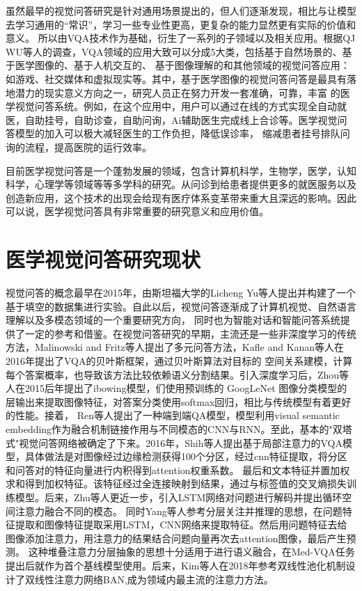 虽然最早的视觉问答研究是针对通用场景提出的，但人们逐渐发现，相比与让模型去学习通用的“常识”，学习一些专业性更高，更复杂的能力显然更有实际的价值和意义。
所以由VQA技术作为基础，衍生了一系列的子领域以及相关应用。根据QJ WU等人\cite{wu2017visual}的调查，VQA领域的应用大致可以分成5大类，包括基于自然场景的、基于医学图像的、基于人机交互的、
基于图像理解的和其他领域的视觉问答应用：如游戏、社交媒体和虚拟现实等。其中，基于医学图像的视觉问答问答是最具有落地潜力的现实意义方向之一，研究人员正在努力开发一套准确，可靠，丰富
的医学视觉问答系统。例如，在这个应用中，用户可以通过在线的方式实现全自动就医，自助挂号，自助诊查，自助问询，Ai辅助医生完成线上合诊等。医学视觉问答模型的加入可以极大减轻医生的工作负担，降低误诊率，
缩减患者挂号排队问询的流程，提高医院的运行效率。

目前医学视觉问答是一个蓬勃发展的领域，包含计算机科学，生物学，医学，认知科学，心理学等领域等等多学科的研究。从问诊到给患者提供更多的就医服务以及
创造新应用，这个技术的出现会给现有医疗体系变革带来重大且深远的影响。因此可以说，医学视觉问答具有非常重要的研究意义和应用价值。

%
\section{医学视觉问答研究现状}
视觉问答的概念最早在2015年，由斯坦福大学的Licheng Yu等人提出\cite{yu2015visual}并构建了一个基于填空的数据集进行实验。自此以后，视觉问答逐渐成了计算机视觉、自然语言理解以及多模态领域的一个重要研究方向，
同时也为智能对话和智能问答系统提供了一定的参考和借鉴。在视觉问答研究的早期，主流还是一些非深度学习的传统方法，Malinowski and Fritz等人提出了多元问答方法\cite{malinowski2014multi}，Kafle and Kanan等人\cite{kafle2016answer}在2016年提出了VQA的贝叶斯框架，通过贝叶斯算法对目标的
空间关系建模，计算每个答案概率，也导致该方法比较依赖语义分割结果。引入深度学习后，Zhou等人\cite{zhou2015simple}在2015后年提出了ibowing模型，们使用预训练的 GoogLeNet 图像分类模型的层输出来提取图像特征，对答案分类使用softmax回归，相比与传统模型有着更好的性能。接着，
Ren等人\cite{ren2015exploring}提出了一种端到端QA模型，模型利用visual semantic embedding作为融合机制链接作用与不同模态的CNN与RNN。至此，基本的"双塔式"视觉问答网络被确定了下来。2016年，Shih等人\cite{shih2016look}提出基于局部注意力的VQA模型，具体做法是对图像经过边缘检测获得100个分区，经过cnn特征提取，将分区和问答对的特征向量进行内积得到attention权重系数。
最后和文本特征并置加权求和得到加权特征。该特征经过全连接映射到结果，通过与标签值的交叉熵损失训练模型。后来，Zhu等人\cite{zhu2016visual7w}更近一步，引入LSTM网络对问题进行解码并提出循环空间注意力融合不同的模态。
同时Yang等人参考分层关注并推理的思想，在问题特征提取和图像特征提取采用LSTM，CNN网络来提取特征。然后用问题特征去给图像添加注意力，用注意力的结果结合问题向量再次去attention图像，最后产生预测。
这种堆叠注意力分层抽象的思想十分适用于进行语义融合，在Med-VQA任务提出后就作为首个基线模型使用\cite{liu2016attention}。后来，Kim等人在2018年参考双线性池化机制设计了双线性注意力网络BAN\cite{kim2018bilinear},成为领域内最主流的注意力方法。

